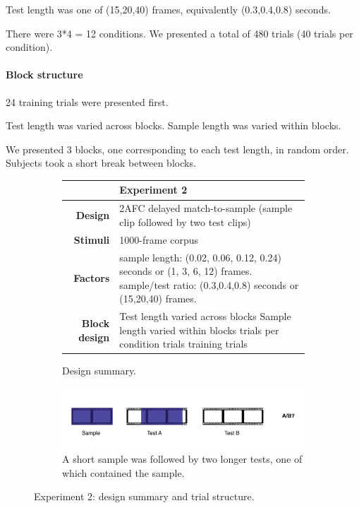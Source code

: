 Test length was one of (15,20,40) frames, equivalently (0.3,0.4,0.8) seconds.

There were 3*4 = 12 conditions. We presented a total of 480 trials (40 trials per condition).

\paragraph{Block structure}

24 training trials were presented first.

Test length was varied across blocks. Sample length was varied within blocks.

We presented 3 blocks, one corresponding to each test length, in random order. Subjects took a short break between blocks.

\begin{figure}[H]
\centering
\renewcommand{\arraystretch}{1.8}

      \begin{subfigure}[b]{\textwidth}
\begin{tabular}{ >{\bfseries}r | p{8cm}   }
& \textbf{Experiment 2}\\
\hline
  
	Design & 2AFC delayed match-to-sample (sample clip followed by two test clips)\\                   
  Stimuli & 1000-frame corpus \\
  Factors & sample length: (0.02, 0.06, 0.12, 0.24) seconds or (1, 3, 6, 12) frames. \newline 
sample/test ratio: (0.3,0.4,0.8) seconds or (15,20,40) frames.\\
  Block design & Test length varied across blocks\newline
			Sample length varied within blocks \newline
			12 \newline
40 trials per condition \newline
600 trials \newline
25 training trials \\
\end{tabular}
\caption{Design summary.}
   \end{subfigure}

\begin{subfigure}[b]{\textwidth}
\centering
                \includegraphics[width=12cm]{img/protocol_2afc.png}
                \caption{A short sample was followed by two longer tests, one of which contained the sample.}
         
        \end{subfigure}
\caption{Experiment 2: design summary and trial structure.}
\end{figure}


